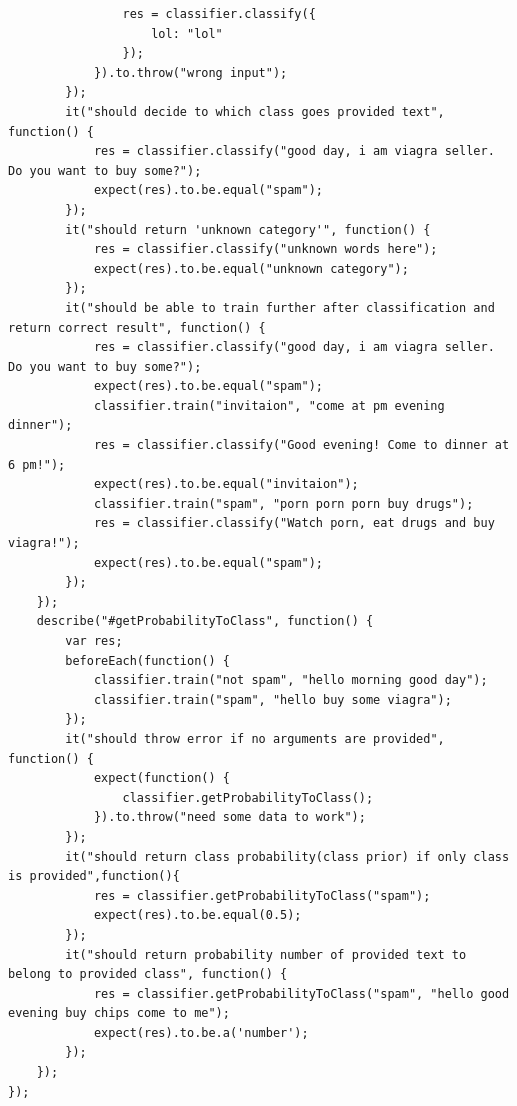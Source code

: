 \documentclass[14pt,a4paper]{extreport}
\begin{document}
\begin{verbatim}
				res = classifier.classify({
					lol: "lol"
				});
			}).to.throw("wrong input");
		});
		it("should decide to which class goes provided text", function() {
			res = classifier.classify("good day, i am viagra seller. Do you want to buy some?");
			expect(res).to.be.equal("spam");
		});
		it("should return 'unknown category'", function() {
			res = classifier.classify("unknown words here");
			expect(res).to.be.equal("unknown category");
		});
		it("should be able to train further after classification and return correct result", function() {
			res = classifier.classify("good day, i am viagra seller. Do you want to buy some?");
			expect(res).to.be.equal("spam");
			classifier.train("invitaion", "come at pm evening dinner");
			res = classifier.classify("Good evening! Come to dinner at 6 pm!");
			expect(res).to.be.equal("invitaion");
			classifier.train("spam", "porn porn porn buy drugs");
			res = classifier.classify("Watch porn, eat drugs and buy viagra!");
			expect(res).to.be.equal("spam");
		});
	});
	describe("#getProbabilityToClass", function() {
		var res;
		beforeEach(function() {
			classifier.train("not spam", "hello morning good day");
			classifier.train("spam", "hello buy some viagra");
		});
		it("should throw error if no arguments are provided", function() {
			expect(function() {
				classifier.getProbabilityToClass();
			}).to.throw("need some data to work");
		});
		it("should return class probability(class prior) if only class is provided",function(){
			res = classifier.getProbabilityToClass("spam");
			expect(res).to.be.equal(0.5);
		});
		it("should return probability number of provided text to belong to provided class", function() {
			res = classifier.getProbabilityToClass("spam", "hello good evening buy chips come to me");
			expect(res).to.be.a('number');
		});
	});
});
    \end{verbatim}
\end{document}
